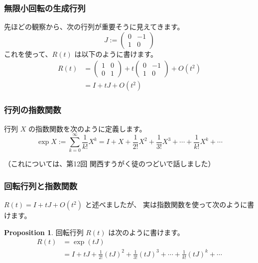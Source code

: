 \documentclass{beamer}
\theoremstyle{definition}
\newtheorem{proposition}{Proposition}
\begin{document}
\begin{frame}
    \frametitle{無限小回転の生成行列}

    先ほどの観察から、次の行列が重要そうに見えてきます。
    \[
        J :=
        \begin{pmatrix}
            0 & - 1 \\
            1 & 0
        \end{pmatrix}
    \]
    これを使って、\(R(t)\) は以下のように書けます。
    \begin{align*}
        R(t) & =
        \begin{pmatrix}
            1 & 0 \\
            0 & 1
        \end{pmatrix}
        + t
        \begin{pmatrix}
            0 & - 1 \\
            1 & 0
        \end{pmatrix} + O(t^2) \\
             & = I + t J + O(t^2)
    \end{align*}
\end{frame}

\begin{frame}
    \frametitle{行列の指数関数}

    \begin{definition}
        行列 \(X\) の指数関数を次のように定義します。
        \[
            \exp X := \sum_{k=0}^{\infty} \frac{1}{k!} X^k
            = I + X + \frac{1}{2!}X^2 + \frac{1}{3!}X^3 + \cdots + \frac{1}{k!}X^k + \cdots
        \]
    \end{definition}

    （これについては、第12回 関西すうがく徒のつどいで話しました）
\end{frame}

\begin{frame}
    \frametitle{回転行列と指数関数}

    \(R(t) = I + t J + O(t^2)\) と述べましたが、
    実は指数関数を使って次のように書けます。

    \begin{proposition}
        回転行列 \(R(t)\) は次のように書けます。
        \begin{align*}
            R(t) & = \exp (tJ)                                                                                     \\
                 & = I + tJ + \frac{1}{2!}{(tJ)}^2 + \frac{1}{3!}{(tJ)}^3 + \cdots + \frac{1}{k!}{(tJ)}^k + \cdots
        \end{align*}
    \end{proposition}
\end{frame}
\end{document}
